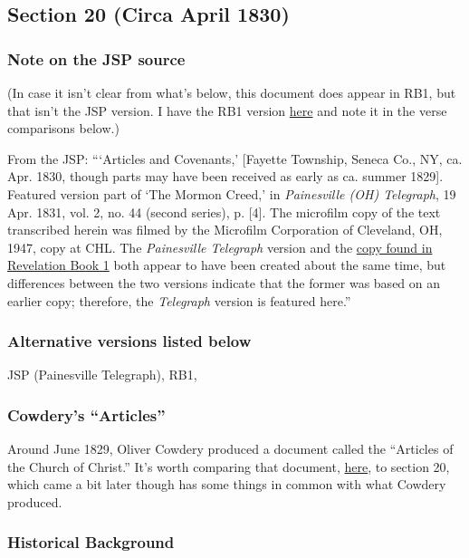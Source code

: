\subsection{Section 20 (Circa April 1830)}
	\label{DC20}
	
	\subsubsection{Note on the JSP source}
	
		(In case it isn't clear from what's below, this document does appear in RB1, but that isn't the JSP version. I have the RB1 version \hyperref[EXSS-DC20-RB1]{here} and note it in the verse comparisons below.)
	
		From the JSP: ```Articles and Covenants,' [Fayette Township, Seneca Co., NY, ca. Apr. 1830, though parts may have been received as early as ca. summer 1829]. Featured version part of `The Mormon Creed,' in \textit{Painesville (OH) Telegraph}, 19 Apr. 1831, vol. 2, no. 44 (second series), p. [4]. The microfilm copy of the text transcribed herein was filmed by the Microfilm Corporation of Cleveland, OH, 1947, copy at CHL. The \textit{Painesville Telegraph} version and the \hyperref[EXSS-DC20-RB1]{copy found in Revelation Book 1} both appear to have been created about the same time, but differences between the two versions indicate that the former was based on an earlier copy; therefore, the \textit{Telegraph} version is featured here.''
		
	\subsubsection{Alternative versions listed below}
	
		JSP (Painesville Telegraph), RB1, 
		
	\subsubsection{Cowdery's ``Articles''}
	
		Around June 1829, Oliver Cowdery produced a document called the ``Articles of the Church of Christ.'' It's worth comparing that document, \hyperref[EMS-1828-1829-OC-JUNE-1829]{here}, to section 20, which came a bit later though has some things in common with what Cowdery produced.
	
	\subsubsection{Historical Background}
		\label{DC20-HB}
		
